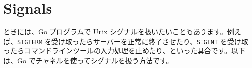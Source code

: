 \section{Signals}

ときには、Go プログラムで Unix シグナルを扱いたいこともあります。例えば、\texttt{SIGTERM} を受け取ったらサーバーを正常に終了させたり、\texttt{SIGINT} を受け取ったらコマンドラインツールの入力処理を止めたり、といった具合です。以下は、Go でチャネルを使ってシグナルを扱う方法です。




